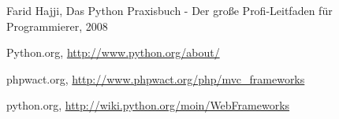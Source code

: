 
\begin{thebibliography}{99}
Farid Hajji, Das Python Praxisbuch - Der große Profi-Leitfaden für
Programmierer, 2008

Python.org, \url{http://www.python.org/about/}

phpwact.org, \url{http://www.phpwact.org/php/mvc_frameworks}

python.org, \url{http://wiki.python.org/moin/WebFrameworks}
\end{thebibliography}


%
